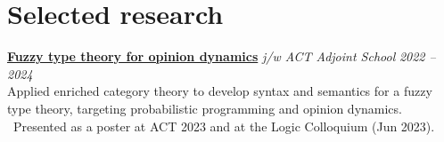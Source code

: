 \documentclass[a4paper,10pt]{article}
\begin{document}
%
%
%
%
%
%

\section*{ Selected research}

\textbf{\href{https://arxiv.org/abs/2406.03292}{Fuzzy type theory for opinion dynamics}} \textit{j/w ACT Adjoint School} \hfill \textit{2022 -- 2024} \\
Applied enriched category theory to develop syntax and semantics for a fuzzy type theory, targeting probabilistic programming and opinion dynamics. \\
\, Presented as a poster at ACT 2023 and at the Logic Colloquium (Jun 2023).
\end{document}
